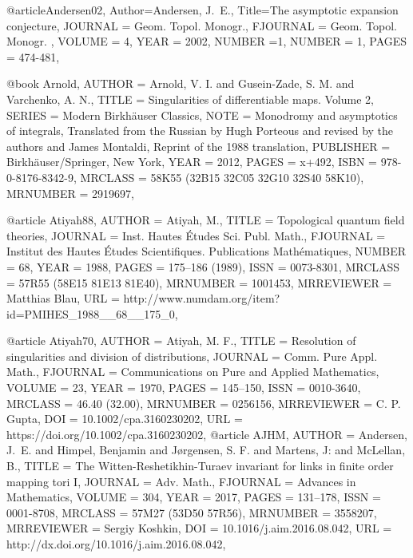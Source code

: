 @article{Andersen02,
Author={Andersen, J.~E.},
Title={The asymptotic expansion conjecture},
JOURNAL = {Geom. Topol. Monogr.},
FJOURNAL = {Geom. Topol. Monogr.} ,
    VOLUME = {4},
      YEAR = {2002},
      NUMBER ={1},
    NUMBER = {1},
     PAGES = {474-481},
}



@book {Arnold,
    AUTHOR = {Arnold, V. I. and Gusein-Zade, S. M. and Varchenko, A. N.},
     TITLE = {Singularities of differentiable maps. {V}olume 2},
    SERIES = {Modern Birkh\"auser Classics},
      NOTE = {Monodromy and asymptotics of integrals,
              Translated from the Russian by Hugh Porteous and revised by
              the authors and James Montaldi,
              Reprint of the 1988 translation},
 PUBLISHER = {Birkh\"auser/Springer, New York},
      YEAR = {2012},
     PAGES = {x+492},
      ISBN = {978-0-8176-8342-9},
   MRCLASS = {58K55 (32B15 32C05 32G10 32S40 58K10)},
  MRNUMBER = {2919697},
}

@article {Atiyah88,
    AUTHOR = {Atiyah, M.},
     TITLE = {Topological quantum field theories},
   JOURNAL = {Inst. Hautes \'Etudes Sci. Publ. Math.},
  FJOURNAL = {Institut des Hautes \'Etudes Scientifiques. Publications
              Math\'ematiques},
    NUMBER = {68},
      YEAR = {1988},
     PAGES = {175--186 (1989)},
      ISSN = {0073-8301},
   MRCLASS = {57R55 (58E15 81E13 81E40)},
  MRNUMBER = {1001453},
MRREVIEWER = {Matthias Blau},
       URL = {http://www.numdam.org/item?id=PMIHES_1988__68__175_0},
}

@article {Atiyah70,
    AUTHOR = {Atiyah, M. F.},
     TITLE = {Resolution of singularities and division of distributions},
   JOURNAL = {Comm. Pure Appl. Math.},
  FJOURNAL = {Communications on Pure and Applied Mathematics},
    VOLUME = {23},
      YEAR = {1970},
     PAGES = {145--150},
      ISSN = {0010-3640},
   MRCLASS = {46.40 (32.00)},
  MRNUMBER = {0256156},
MRREVIEWER = {C. P. Gupta},
       DOI = {10.1002/cpa.3160230202},
       URL = {https://doi.org/10.1002/cpa.3160230202},
}
@article {AJHM,
    AUTHOR = {Andersen, J.~E. and Himpel, Benjamin and J\o{}rgensen,
              S. F. and Martens, J: and McLellan, B.},
     TITLE = {The {W}itten-{R}eshetikhin-{T}uraev invariant for links in
              finite order mapping tori {I}},
   JOURNAL = {Adv. Math.},
  FJOURNAL = {Advances in Mathematics},
    VOLUME = {304},
      YEAR = {2017},
     PAGES = {131--178},
      ISSN = {0001-8708},
   MRCLASS = {57M27 (53D50 57R56)},
  MRNUMBER = {3558207},
MRREVIEWER = {Sergiy Koshkin},
       DOI = {10.1016/j.aim.2016.08.042},
       URL = {http://dx.doi.org/10.1016/j.aim.2016.08.042},
}

